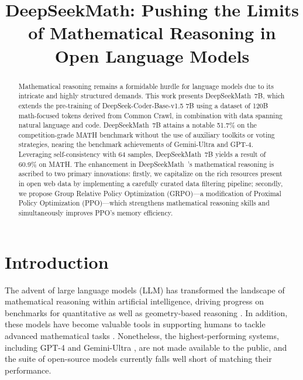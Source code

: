 \title{DeepSeekMath: Pushing the Limits of Mathematical Reasoning in Open Language Models}

\begin{abstract}
Mathematical reasoning remains a formidable hurdle for language models due to its intricate and highly structured demands. This work presents DeepSeekMath~7B, which extends the pre-training of DeepSeek-Coder-Base-v1.5 7B using a dataset of 120B math-focused tokens derived from Common Crawl, in combination with data spanning natural language and code. DeepSeekMath~7B attains a notable 51.7\% on the competition-grade MATH benchmark without the use of auxiliary toolkits or voting strategies, nearing the benchmark achievements of Gemini-Ultra and GPT-4. Leveraging self-consistency with 64 samples, DeepSeekMath~7B yields a result of 60.9\% on MATH. The enhancement in DeepSeekMath~’s mathematical reasoning is ascribed to two primary innovations: firstly, we capitalize on the rich resources present in open web data by implementing a carefully curated data filtering pipeline; secondly, we propose Group Relative Policy Optimization (GRPO)—a modification of Proximal Policy Optimization (PPO)—which strengthens mathematical reasoning skills and simultaneously improves PPO’s memory efficiency.
\end{abstract}

\section{Introduction}

The advent of large language models (LLM) has transformed the landscape of mathematical reasoning within artificial intelligence, driving progress on benchmarks for quantitative \citep{MATH} as well as geometry-based reasoning \citep{trinh2024solving}. In addition, these models have become valuable tools in supporting humans to tackle advanced mathematical tasks \citep{tao}. Nonetheless, the highest-performing systems, including GPT-4 \citep{gpt4} and Gemini-Ultra \citep{gemini}, are not made available to the public, and the suite of open-source models currently falls well short of matching their performance.

